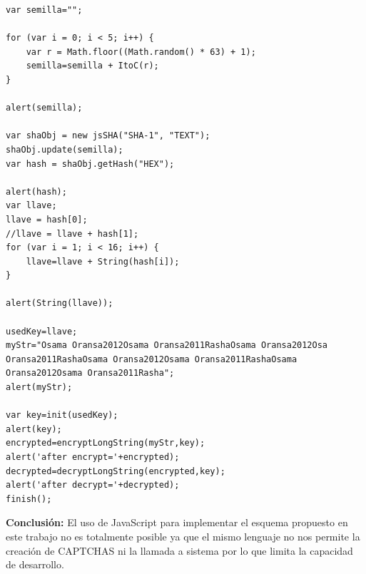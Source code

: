 \documentclass[12pt,oneside,onecolumn,openany]{report}
\begin{document}
\begin{lstlisting}[frame=single]
 var semilla="";

for (var i = 0; i < 5; i++) {
	var r = Math.floor((Math.random() * 63) + 1);
	semilla=semilla + ItoC(r);
}

alert(semilla);

var shaObj = new jsSHA("SHA-1", "TEXT");
shaObj.update(semilla);
var hash = shaObj.getHash("HEX");

alert(hash);
var llave;
llave = hash[0];
//llave = llave + hash[1];
for (var i = 1; i < 16; i++) {
	llave=llave + String(hash[i]);
}

alert(String(llave));

usedKey=llave;
myStr="Osama Oransa2012Osama Oransa2011RashaOsama Oransa2012Osa  
Oransa2011RashaOsama Oransa2012Osama Oransa2011RashaOsama 
Oransa2012Osama Oransa2011Rasha";
alert(myStr);

var key=init(usedKey);
alert(key);
encrypted=encryptLongString(myStr,key);
alert('after encrypt='+encrypted);
decrypted=decryptLongString(encrypted,key);
alert('after decrypt='+decrypted);
finish();

\end{lstlisting}
\textbf{Conclusión:} El uso de JavaScript para implementar el esquema propuesto en este trabajo no es totalmente posible ya que el mismo lenguaje no nos permite la creación de CAPTCHAS ni la llamada a sistema por lo que limita la capacidad de desarrollo.
\end{document}
